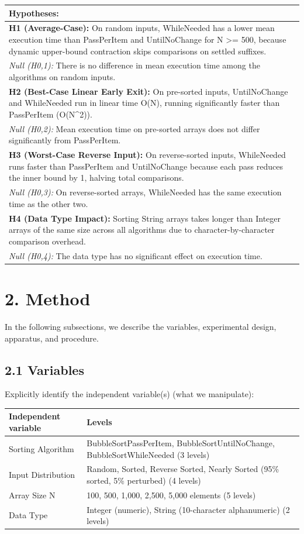 \documentclass[10pt,a4paper]{article}
\begin{document}
\vspace{0.2em}
\noindent
{\small
\begin{tabularx}{\textwidth}{|X|}
\hline
\rowcolor{black} \color{white}\textbf{Hypotheses:} \\
\hline
\textbf{H1 (Average-Case):} On random inputs, WhileNeeded has a lower mean execution time than PassPerItem and UntilNoChange for N >= 500, because dynamic upper-bound contraction skips comparisons on settled suffixes.\\
\textit{Null (H0,1):} There is no difference in mean execution time among the algorithms on random inputs.\\[0.15em]
\textbf{H2 (Best-Case Linear Early Exit):} On pre-sorted inputs, UntilNoChange and WhileNeeded run in linear time O(N), running significantly faster than PassPerItem (O(N\textasciicircum 2)).\\
\textit{Null (H0,2):} Mean execution time on pre-sorted arrays does not differ significantly from PassPerItem.\\[0.15em]
\textbf{H3 (Worst-Case Reverse Input):} On reverse-sorted inputs, WhileNeeded runs faster than PassPerItem and UntilNoChange because each pass reduces the inner bound by 1, halving total comparisons.\\
\textit{Null (H0,3):} On reverse-sorted arrays, WhileNeeded has the same execution time as the other two.\\[0.15em]
\textbf{H4 (Data Type Impact):} Sorting String arrays takes longer than Integer arrays of the same size across all algorithms due to character-by-character comparison overhead.\\
\textit{Null (H0,4):} The data type has no significant effect on execution time. \\
\hline
\end{tabularx}
}

\section*{2. Method}
In the following subsections, we describe the variables, experimental design, apparatus, and procedure.

\subsection*{2.1 Variables}
Explicitly identify the independent variable(s) (what we manipulate):

\noindent
\begin{tabularx}{\textwidth}{|l|X|}
\hline
\rowcolor{black} \color{white}\textbf{Independent variable} & \color{white}\textbf{Levels} \\
\hline
Sorting Algorithm & BubbleSortPassPerItem, BubbleSortUntilNoChange, BubbleSortWhileNeeded (3 levels) \\
Input Distribution & Random, Sorted, Reverse Sorted, Nearly Sorted (95\% sorted, 5\% perturbed) (4 levels) \\
Array Size N & 100, 500, 1,000, 2,500, 5,000 elements (5 levels) \\
Data Type & Integer (numeric), String (10-character alphanumeric) (2 levels) \\
\hline
\end{tabularx}
\end{document}
